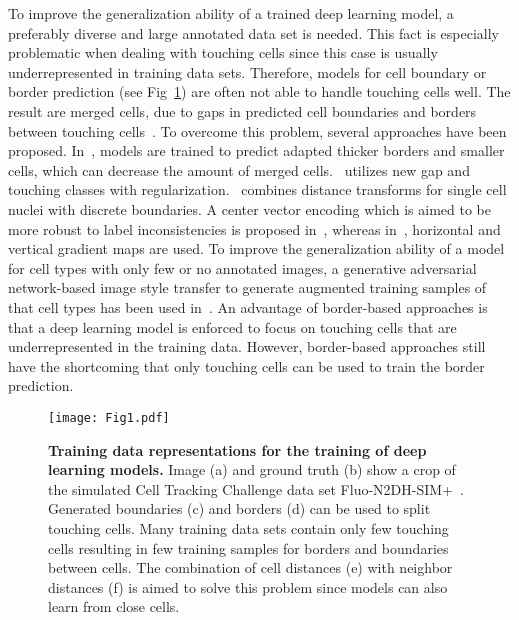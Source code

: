 \documentclass[10pt,letterpaper]{article}
\begin{document}
To improve the generalization ability of a trained deep learning model, a preferably diverse and large annotated data set is needed. This fact is especially problematic when dealing with touching cells since this case is usually underrepresented in training data sets. Therefore, models for cell boundary or border prediction (see Fig~\ref{fig:trainingDataRepresentations}) are often not able to handle touching cells well. The result are merged cells, due to gaps in predicted cell boundaries and borders between touching cells~\cite{Scherr2018, Pena2019}. To overcome this problem, several approaches have been proposed. In~\cite{Scherr2018}, models are trained to predict adapted thicker borders and smaller cells, which can decrease the amount of merged cells. \cite{Pena2019}~utilizes new gap and touching classes with  regularization. \cite{Li2019}~combines distance transforms for single cell nuclei with discrete boundaries. A center vector encoding which is aimed to be more robust to label inconsistencies is proposed in~\cite{Li2019b}, whereas in~\cite{Graham2019}, horizontal and vertical gradient maps are used. To improve the generalization ability of a model for cell types with only few or no annotated images, a generative adversarial network-based image style transfer to generate augmented training samples of that cell types has been used in~\cite{Hollandi2019}. An advantage of border-based approaches is that a deep learning model is enforced to focus on touching cells that are underrepresented in the training data. However, border-based approaches still have the shortcoming that only touching cells can be used to train the border prediction.
\begin{figure}
\begin{adjustwidth}{-2.25in}{0in}
\centering
\texttt{[image: Fig1.pdf]}
\caption{\textbf{Training data representations for the training of deep learning models.} Image (a) and ground truth (b) show a crop of the simulated Cell Tracking Challenge data set Fluo-N2DH-SIM+~\cite{Ulman2017, Maska2014}. Generated boundaries (c) and borders (d) can be used to split touching cells. Many training data sets contain only few touching cells resulting in few training samples for borders and boundaries between cells. The combination of cell distances (e) with neighbor distances (f) is aimed to solve this problem since models can also learn from close cells.}
\label{fig:trainingDataRepresentations}
\end{adjustwidth}
\end{figure}
\end{document}

